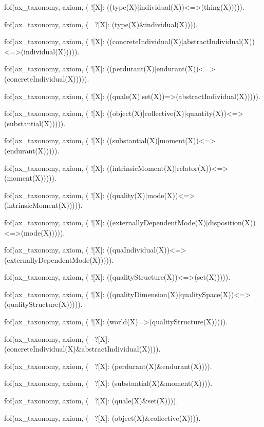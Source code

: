 


fof(ax_taxonomy, axiom, (
![X]: ((type(X)|individual(X))<=>(thing(X))))).

fof(ax_taxonomy, axiom, (
    ~?[X]: (type(X)&individual(X)))).



fof(ax_taxonomy, axiom, (
![X]: ((concreteIndividual(X)|abstractIndividual(X))<=>(individual(X))))).


fof(ax_taxonomy, axiom, (
![X]: ((perdurant(X)|endurant(X))<=>(concreteIndividual(X))))).


fof(ax_taxonomy, axiom, (
![X]: ((quale(X)|set(X))=>(abstractIndividual(X))))).

fof(ax_taxonomy, axiom, (
![X]: ((object(X)|collective(X)|quantity(X))<=>(substantial(X))))).


fof(ax_taxonomy, axiom, (
![X]: ((substantial(X)|moment(X))<=>(endurant(X))))).

fof(ax_taxonomy, axiom, (
![X]: ((intrinsicMoment(X)|relator(X))<=>(moment(X))))).

fof(ax_taxonomy, axiom, (
![X]: ((quality(X)|mode(X))<=>(intrinsicMoment(X))))).

fof(ax_taxonomy, axiom, (
![X]: ((externallyDependentMode(X)|disposition(X))<=>(mode(X))))).

fof(ax_taxonomy, axiom, (
![X]: ((quaIndividual(X))<=>(externallyDependentMode(X))))).

fof(ax_taxonomy, axiom, (
![X]: ((qualityStructure(X))<=>(set(X))))).

fof(ax_taxonomy, axiom, (
![X]: ((qualityDimension(X)|qualitySpace(X))<=>(qualityStructure(X))))).


fof(ax_taxonomy, axiom, (
![X]: (world(X)=>(qualityStructure(X))))).



fof(ax_taxonomy, axiom, (
    ~?[X]: (concreteIndividual(X)&abstractIndividual(X)))).

fof(ax_taxonomy, axiom, (
    ~?[X]: (perdurant(X)&endurant(X)))).


fof(ax_taxonomy, axiom, (
    ~?[X]: (substantial(X)&moment(X)))).

fof(ax_taxonomy, axiom, (
    ~?[X]: (quale(X)&set(X)))).


fof(ax_taxonomy, axiom, (
    ~?[X]: (object(X)&collective(X)))).


